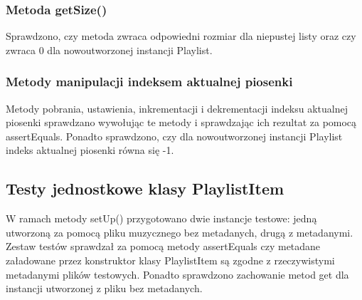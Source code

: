 \documentclass[12pt,a4paper,notitlepage]{article}
\begin{document}
\subsubsection{Metoda getSize()}
Sprawdzono, czy metoda zwraca odpowiedni rozmiar dla niepustej listy oraz czy zwraca 0 dla nowoutworzonej instancji Playlist. 
\subsubsection{Metody manipulacji indeksem aktualnej piosenki}
Metody pobrania, ustawienia, inkrementacji i dekrementacji indeksu aktualnej piosenki sprawdzano wywołując te metody i sprawdzając ich rezultat za pomocą assertEquals. Ponadto sprawdzono, czy
dla nowoutworzonej instancji Playlist indeks aktualnej piosenki równa się -1.

\subsection{Testy jednostkowe klasy PlaylistItem}
W ramach metody setUp() przygotowano dwie instancje testowe: jedną utworzoną za pomocą pliku muzycznego bez metadanych, drugą z metadanymi.
Zestaw testów sprawdzał za pomocą metody assertEquals czy metadane załadowane przez konstruktor klasy PlaylistItem są zgodne z rzeczywistymi metadanymi plików testowych. Ponadto sprawdzono 
zachowanie metod get dla instancji utworzonej z pliku bez metadanych.
\end{document}
